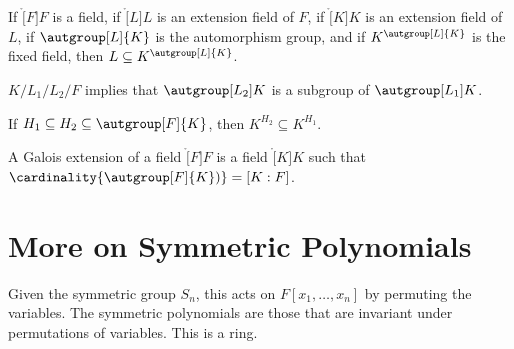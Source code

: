 \documentclass{article}                                                        %
\begin{document}
        \begin{theorem}
            If $\ring[F]{F}$ is a field, if $\ring[L]{L}$ is an extension field
            of $F$, if $\ring[K]{K}$ is an extension field of $L$, if
            $\autgroup[L]{K}$ is the automorphism group, and if
            $K^{\autgroup[L]{K}}$ is the fixed field, then
            $L\subseteq{K}^{\autgroup[L]{K}}$.
        \end{theorem}
        \begin{theorem}
            $K/L_{1}/L_{2}/F$ implies that $\autgroup[L_{2}]{K}$ is a subgroup
            of $\autgroup[L_{1}]{K}$.
        \end{theorem}
        \begin{theorem}
            If $H_{1}\subseteq{H}_{2}\subseteq\autgroup[F]{K}$, then
            $K^{H_{2}}\subseteq{K}^{H_{1}}$.
        \end{theorem}
        \begin{definition}
            A Galois extension of a field $\ring[F]{F}$ is a field $\ring[K]{K}$
            such that $\cardinality{\autgroup[F]{K})}=[K:F]$.
        \end{definition}
    \section{More on Symmetric Polynomials}
        Given the symmetric group $S_{n}$, this acts on $F[x_{1},\dots,x_{n}]$
        by permuting the variables. The symmetric polynomials are those that are
        invariant under permutations of variables. This is a ring.
\end{document}
